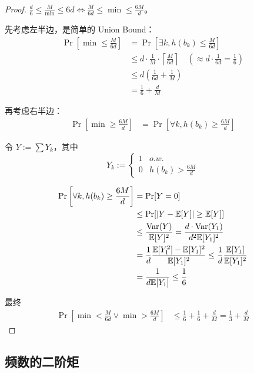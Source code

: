 \begin{proof}
    $\frac{d}{6} \le \frac{M}{\min} \le 6d \iff \frac{M}{6d} \le \min \le \frac{6M}{d}$。

    先考虑左半边，是简单的 Union Bound：
    \begin{align*}
        \Pr\left[\min \le \frac{M}{6d}\right] &= \Pr\left[\exists k, h(b_{k}) \le \frac{M}{6d}\right] \\
        &\le d \cdot \frac{1}{M} \cdot \left\lceil\frac{M}{6d}\right\rceil \quad \left(\approx d \cdot \frac{1}{6d} = \frac{1}{6}\right) \\
        &\le d\left(\frac{1}{6d} + \frac{1}{M}\right) \\
        &= \frac{1}{6} + \frac{d}{M}
    \end{align*}

    再考虑右半边：
    \begin{align*}
        \Pr\left[\min \ge \frac{6M}{d}\right] &= \Pr\left[\forall k, h(b_{k}) \ge \frac{6M}{d}\right]
    \end{align*}

    令 $Y := \sum Y_{k}$，其中
    \[
        Y_{k} := \begin{cases} 1 & o.w. \\ 0 & h(b_{k}) > \frac{6M}{d} \end{cases}
    \]   

    \begin{align*}
        \Pr\left[\forall k, h(b_{k}) \ge \frac{6M}{d}\right] &= \Pr[Y=0] \\
        &\le \Pr[|Y-\mathbb{E}[Y]| \ge \mathbb{E}[Y]] \\
        &\le \frac{\text{Var}(Y)}{\mathbb{E}[Y]^{2}} = \frac{d \cdot \text{Var}(Y_{1})}{d^{2}\mathbb{E}[Y_{1}]^{2}} \\
        &= \frac{1}{d}\frac{\mathbb{E}[Y_{1}^{2}]-\mathbb{E}[Y_{1}]^{2}}{\mathbb{E}[Y_{1}]^{2}} \le \frac{1}{d}\frac{\mathbb{E}[Y_{1}]}{\mathbb{E}[Y_{1}]^{2}} \\
        &= \frac{1}{d\mathbb{E}[Y_{1}]} \le \frac{1}{6}
    \end{align*}

    最终
    \begin{align*}
        \Pr\left[\min < \frac{M}{6d} \lor \min > \frac{6M}{d}\right] &\le \frac{1}{6} + \frac{1}{6} + \frac{d}{M} = \frac{1}{3} + \frac{d}{M}
    \end{align*}
\end{proof}

\subsection{频数的二阶矩} ~


